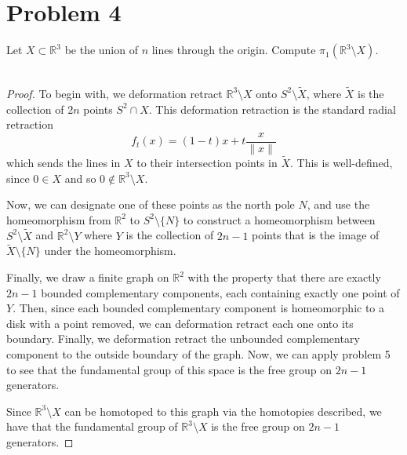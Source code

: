 \documentclass[fontsize=11pt]{scrartcl} %
\numberwithin{equation}{section} %
\numberwithin{figure}{section} %
\numberwithin{table}{section} %
\newcommand{\R}{\mathbb{R}}
\begin{document}
\newpage
\section*{Problem 4}
Let $X\subset \R^3$ be the union of $n$ lines through the origin. Compute
$\pi_1(\R^3\setminus X)$.
\\
\\
\begin{proof}
    To begin with, we deformation retract $\R^3\setminus X$ onto
    $S^2\setminus\tilde{X}$, where $\tilde{X}$ is the collection of $2n$ points
    $S^2\cap X$. This deformation retraction is the standard radial retraction
    \[
        f_t(x) = (1-t)x + t\frac{x}{\|x\|}
    \]
    which sends the lines in $X$ to their intersection points in
    $\tilde{X}$. This is well-defined, since $0\in X$ and so $0\not\in
    \R^3\setminus X$.

    Now, we can designate one of these points as the north pole $N$, and use the
    homeomorphism from $\R^2$ to $S^2\setminus \{N\}$ to construct a
    homeomorphism between $S^2\setminus \tilde{X}$ and $\R^2\setminus Y$ where
    $Y$ is the collection of $2n-1$ points that is the image of
    $\tilde{X}\setminus \{N\}$ under the homeomorphism.

    Finally, we draw a finite graph on $\R^2$ with the property that there are
    exactly $2n-1$ bounded complementary components, each containing exactly one
    point of $Y$.
    Then, since each bounded complementary component is homeomorphic to a disk
    with a point removed, we can deformation retract each one onto its boundary.
    Finally, we deformation retract the unbounded complementary component to the
    outside boundary of the graph. Now, we can apply problem 5 to see that the
    fundamental group of this space is the free group on $2n-1$ generators.

    Since $\R^3\setminus X$ can be homotoped to this graph via the homotopies
    described, we have that the fundamental group of $\R^3\setminus X$ is the
    free group on $2n-1$ generators.

\end{proof}

\newpage
\end{document}
